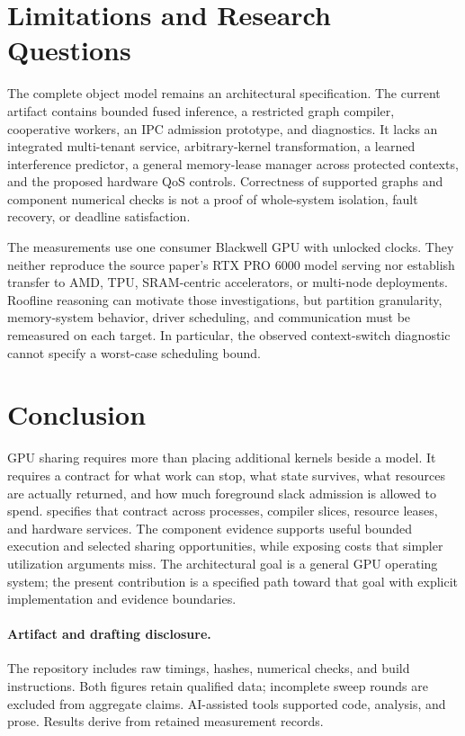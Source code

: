 \section{Limitations and Research Questions}
\label{sec:limits}
The complete object model remains an architectural specification. The current
artifact contains bounded fused inference, a restricted graph compiler,
cooperative workers, an IPC admission prototype, and diagnostics. It lacks
an integrated multi-tenant service, arbitrary-kernel transformation, a learned
interference predictor, a general memory-lease manager across protected
contexts, and the proposed hardware QoS controls. Correctness of supported
graphs and component numerical checks is not a proof of whole-system
isolation, fault recovery, or deadline satisfaction.

The measurements use one consumer Blackwell GPU with unlocked clocks.
They neither reproduce the source paper's RTX PRO 6000 model serving nor
establish transfer to AMD, TPU, SRAM-centric accelerators, or multi-node
deployments. Roofline reasoning can motivate those investigations, but
partition granularity, memory-system behavior, driver scheduling, and
communication must be remeasured on each target. In particular, the observed
context-switch diagnostic cannot specify a worst-case scheduling bound.

\section{Conclusion}
GPU sharing requires more than placing additional kernels beside a model.
It requires a contract for what work can stop, what state survives, what
resources are actually returned, and how much foreground slack admission
is allowed to spend. \system{} specifies that contract across processes,
compiler slices, resource leases, and hardware services. The component
evidence supports useful bounded execution and selected sharing opportunities,
while exposing costs that simpler utilization arguments miss. The architectural
goal is a general GPU operating system; the present contribution is a
specified path toward that goal with explicit implementation and evidence
boundaries.

\paragraph{Artifact and drafting disclosure.}
The repository includes raw timings, hashes, numerical checks, and build
instructions. Both figures retain qualified data; incomplete sweep rounds
are excluded from aggregate claims. AI-assisted tools supported code,
analysis, and prose. Results derive from retained measurement records.
